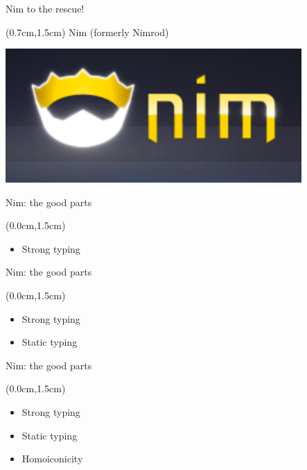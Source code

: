 \documentclass[xetex,14pt,aspectratio=169]{beamer}
\begin{document}
\begin{frame}{Nim to the rescue!}
\begin{textblock*}{\framewidth-0.8cm}(0.7cm,1.5cm) %
Nim (formerly Nimrod)
\begin{minipage}{\textwidth}
  \centering
  \includegraphics[width=11.3cm]{img/nim}
\end{minipage}
\end{textblock*}
\end{frame}

\begin{frame}{Nim: the good parts}
\begin{textblock*}{\framewidth-0.8cm}(0.0cm,1.5cm) %
\begin{itemize}
  \item Strong typing
\end{itemize}
\end{textblock*}
\end{frame}

\begin{frame}{Nim: the good parts}
\begin{textblock*}{\framewidth-0.8cm}(0.0cm,1.5cm) %
\begin{itemize}
  \item Strong typing
  \item Static typing
\end{itemize}
\end{textblock*}
\end{frame}

\begin{frame}{Nim: the good parts}
\begin{textblock*}{\framewidth-0.8cm}(0.0cm,1.5cm) %
\begin{itemize}
  \item Strong typing
  \item Static typing
  \item Homoiconicity
\end{itemize}
\end{textblock*}
\end{frame}
\end{document}
